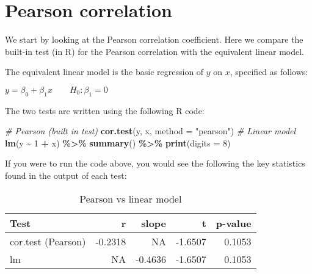 \documentclass[
  12pt,
]{krantz}
\newenvironment{Shaded}{\begin{snugshade}}{\end{snugshade}}
\newcommand{\CommentTok}[1]{\textcolor[rgb]{0.56,0.35,0.01}{\textit{#1}}}
\newcommand{\DataTypeTok}[1]{\textcolor[rgb]{0.13,0.29,0.53}{#1}}
\newcommand{\DecValTok}[1]{\textcolor[rgb]{0.00,0.00,0.81}{#1}}
\newcommand{\KeywordTok}[1]{\textcolor[rgb]{0.13,0.29,0.53}{\textbf{#1}}}
\newcommand{\NormalTok}[1]{#1}
\newcommand{\OperatorTok}[1]{\textcolor[rgb]{0.81,0.36,0.00}{\textbf{#1}}}
\newcommand{\StringTok}[1]{\textcolor[rgb]{0.31,0.60,0.02}{#1}}
\begin{document}
\hypertarget{pearson-correlation}{%
\section{Pearson correlation}\label{pearson-correlation}}

We start by looking at the Pearson correlation coefficient. Here we compare the built-in test (in R) for the Pearson correlation with the equivalent linear model.

The equivalent linear model is the basic regression of \(y\) on \(x\), specified as follows:

\begin{center}

\(y = \beta_0 + \beta_1x \qquad H_0: \beta_1 = 0\)

\end{center}

The two tests are written using the following R code:

\begin{Shaded}
\begin{Highlighting}[]
\CommentTok{\# Pearson (built in test)}
\KeywordTok{cor.test}\NormalTok{(y, x, }\DataTypeTok{method =} \StringTok{"pearson"}\NormalTok{)}
\CommentTok{\# Linear model}
\KeywordTok{lm}\NormalTok{(y }\OperatorTok{\textasciitilde{}}\StringTok{ }\DecValTok{1} \OperatorTok{+}\StringTok{ }\NormalTok{x) }\OperatorTok{\%\textgreater{}\%}\StringTok{ }\KeywordTok{summary}\NormalTok{() }\OperatorTok{\%\textgreater{}\%}\StringTok{ }\KeywordTok{print}\NormalTok{(}\DataTypeTok{digits =} \DecValTok{8}\NormalTok{)}
\end{Highlighting}
\end{Shaded}

If you were to run the code above, you would see the following the key statistics found in the output of each test:

\begin{table}

\caption{\label{tab:unnamed-chunk-14}Pearson vs linear model}
\centering
\begin{tabular}[t]{lrrrr}
\toprule
Test & r & slope & t & p-value\\
\midrule
cor.test (Pearson) & -0.2318 & NA & -1.6507 & 0.1053\\
lm & NA & -0.4636 & -1.6507 & 0.1053\\
\bottomrule
\end{tabular}
\end{table}
\end{document}
